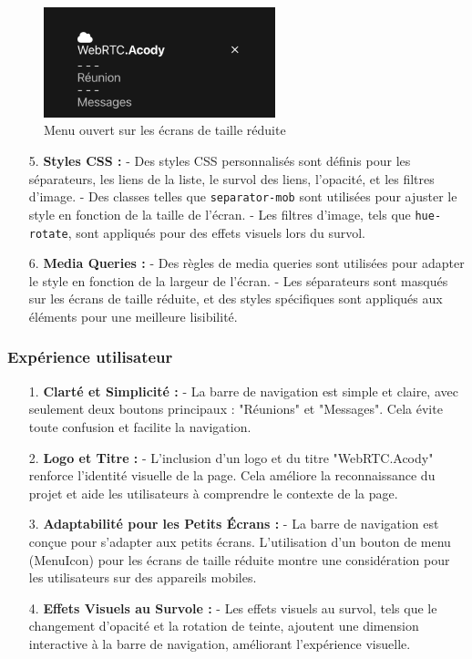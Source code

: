 \documentclass[12pt, a4paper, oneside]{Thesis}
\begin{document}
\begin{figure}[h]
    \centering
    \includegraphics[width=0.6\textwidth]{images/NavBarMobileOpen.png}
    \caption{Menu ouvert sur les écrans de taille réduite}
\end{figure}

\begin{enumerate}
    \item[5.] \textbf{Styles CSS :}
    - Des styles CSS personnalisés sont définis pour les séparateurs, les liens de la liste, le survol des liens, l'opacité, et les filtres d'image.
    - Des classes telles que \texttt{separator-mob} sont utilisées pour ajuster le style en fonction de la taille de l'écran.
    - Les filtres d'image, tels que \texttt{hue-rotate}, sont appliqués pour des effets visuels lors du survol.

    \item[6.] \textbf{Media Queries :}
    - Des règles de media queries sont utilisées pour adapter le style en fonction de la largeur de l'écran.
    - Les séparateurs sont masqués sur les écrans de taille réduite, et des styles spécifiques sont appliqués aux éléments pour une meilleure lisibilité.
\end{enumerate}

\subsubsection{Expérience utilisateur}
\begin{enumerate}
    \item[1.] \textbf{Clarté et Simplicité :}
    - La barre de navigation est simple et claire, avec seulement deux boutons principaux : "Réunions" et "Messages". Cela évite toute confusion et facilite la navigation.

    \item[2.] \textbf{Logo et Titre :}
    - L'inclusion d'un logo et du titre "WebRTC.Acody" renforce l'identité visuelle de la page. Cela améliore la reconnaissance du projet et aide les utilisateurs à comprendre le contexte de la page.
  
    \item[3.] \textbf{Adaptabilité pour les Petits Écrans :}
    - La barre de navigation est conçue pour s'adapter aux petits écrans. L'utilisation d'un bouton de menu (MenuIcon) pour les écrans de taille réduite montre une considération pour les utilisateurs sur des appareils mobiles.

    \item[4.] \textbf{Effets Visuels au Survole :}
    - Les effets visuels au survol, tels que le changement d'opacité et la rotation de teinte, ajoutent une dimension interactive à la barre de navigation, améliorant l'expérience visuelle.

\end{enumerate}
\end{document}
